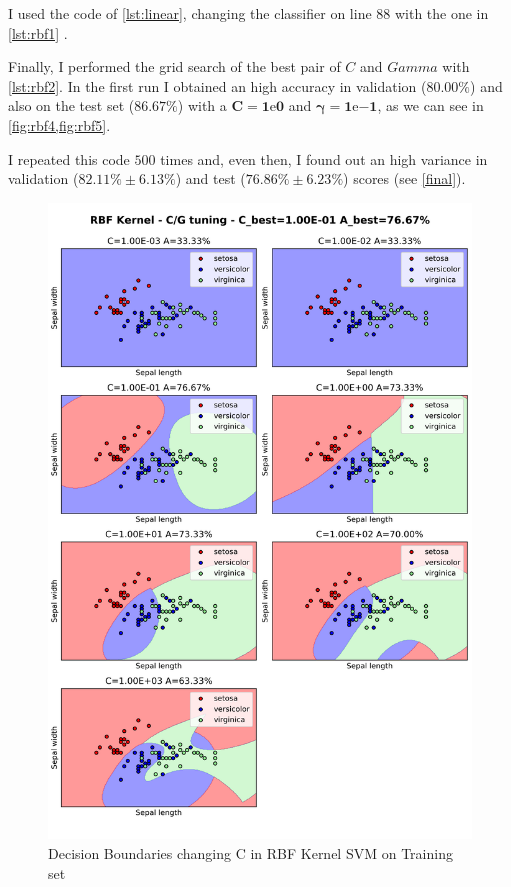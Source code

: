 \documentclass[a4paper, 11pt]{article}
\begin{document}
	I used the code of \vref{lst:linear}, changing the classifier on line $88$ with the one in \vref{lst:rbf1} .
	
	
	
	Finally, I performed the grid search of the best pair of $C$ and $Gamma$ with \vref{lst:rbf2}. In the first run I obtained an high accuracy in validation ($\boldsymbol{80.00\%}$) and also on the test set ($\boldsymbol{86.67\%}$) with a $\boldsymbol{C=1\mathrm{e}{0}}$ and $\boldsymbol{\gamma=1\mathrm{e}{-1}}$, as we can see in \vref{fig:rbf4,fig:rbf5}.
	
	
	
	I repeated this code $500$ times and, even then, I found out an high variance in validation ($\boldsymbol{82.11\%\pm6.13\%}$) and test ($\boldsymbol{76.86\%\pm6.23\%}$) scores  (see \vref{final}).
	
	\begin{figure}[ht!]
		\centering
		\includegraphics[height=0.8\paperheight]{img/fig02a.png}
		\caption{Decision Boundaries changing C in RBF Kernel SVM on Training set}
		\label{fig:rbf1}
	\end{figure}
	
\end{document}
